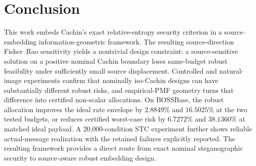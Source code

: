 \documentclass[10pt]{article}
\begin{document}
\section{Conclusion}
This work embeds Cachin's exact relative-entropy security criterion in a source--embedding information-geometric framework. The resulting source-direction Fisher--Rao sensitivity yields a nontrivial design constraint: a source-sensitive solution on a positive nominal Cachin boundary loses same-budget robust feasibility under sufficiently small source displacement. Controlled and natural-image experiments confirm that nominally iso-Cachin designs can have substantially different robust risks, and empirical-PMF geometry turns that difference into certified non-scalar allocations. On BOSSBase, the robust allocation improves the ideal rate envelope by \(2.8849\%\) and \(16.5025\%\) at the two tested budgets, or reduces certified worst-case risk by \(6.7272\%\) and \(38.1360\%\) at matched ideal payload. A 20,000-condition STC experiment further shows reliable actual-message realization with the retained failures explicitly reported. The resulting framework provides a direct route from exact nominal steganographic security to source-aware robust embedding design.



\end{document}
